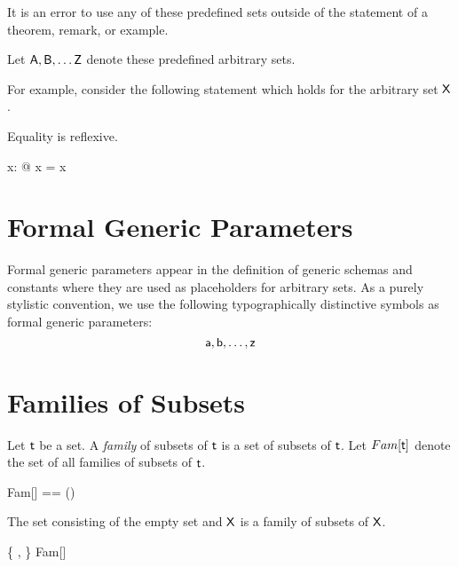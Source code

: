 \documentclass{amsart}
\begin{document}
It is an error to use any of these predefined sets outside of the statement of a theorem, remark, or example.

Let $\mathsf{A}, \mathsf{B}, \dots \mathsf{Z}$ denote these predefined arbitrary sets.

\begin{zed}
	[\setA, \setB, \setC, \setD, \setE, \setF, \setG, \setH, \setI, \setJ, \setK, \setL, \setM, 
	\setN, \setO, \setP, \setQ, \setR, \setS, \setT, \setU, \setV, \setW, \setX, \setY, \setZ]
\end{zed}

For example, consider the following statement which holds for the arbitrary set $\mathsf{X}$.

\begin{remark}
Equality is reflexive.
\begin{zed}
	\forall x: \setX @ x = x
\end{zed}
\end{remark}

\section{Formal Generic Parameters}

Formal generic parameters appear in the definition of generic schemas and constants where
they are used as placeholders for arbitrary sets.
As a purely stylistic convention, we use the following typographically distinctive symbols as formal generic parameters:
\begin{equation*}
	\mathsf{a}, \mathsf{b}, \dots, \mathsf{z}
\end{equation*}

\section{Families of Subsets}

Let $\mathsf{t}$ be a set.
A \textit{family} of subsets of $\mathsf{t}$ is a set of subsets of $\mathsf{t}$.
Let $Fam[\mathsf{t}]$ denote the set of all families of subsets of $\mathsf{t}$.

\begin{zed}
	Fam[\genT] == \power(\power \genT)
\end{zed}

\begin{example}
The set consisting of the empty set and $\mathsf{X}$ is a family of subsets of $\mathsf{X}$.
\begin{zed}
	\{ \emptyset, \setX \} \in Fam[\setX]
\end{zed}
\end{example}
\end{document}
